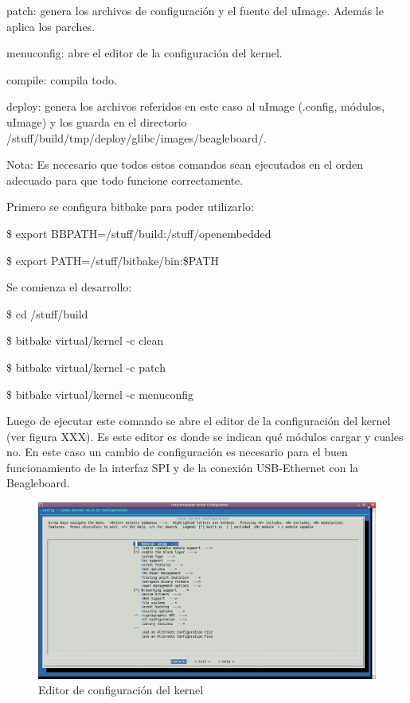 patch: genera los archivos de configuración y el fuente del uImage. Además le aplica los parches.

menuconfig: abre el editor de la configuración del kernel.

compile: compila todo.

deploy: genera los archivos referidos en este caso al uImage (.config, módulos, uImage) y los guarda en el directorio /stuff/build/tmp/deploy/glibc/images/beagleboard/.

\bigskip
Nota: Es necesario que todos estos comandos sean ejecutados en el orden adecuado para que todo funcione correctamente.

\bigskip
Primero se configura bitbake para poder utilizarlo:

\centerline{\$ export BBPATH=/stuff/build:/stuff/openembedded}

\centerline{\$ export PATH=/stuff/bitbake/bin:\$PATH}

\bigskip
Se comienza el desarrollo:

\centerline{\$ cd /stuff/build}

\centerline{\$ bitbake virtual/kernel -c clean}

\centerline{\$ bitbake virtual/kernel -c patch}

\centerline{\$ bitbake virtual/kernel -c menuconfig}

\bigskip
Luego de ejecutar este comando se abre el editor de la configuración del kernel (ver figura XXX). Es este editor es donde se indican qué módulos cargar y cuales no. En este caso un cambio de  configuración es necesario para el buen funcionamiento de la interfaz SPI y de la conexión USB-Ethernet con la Beagleboard.

\begin{figure}[H]
\centering
  \begin{center}
  \includegraphics[scale=.3]{Imagenes/kernel.png} 
  \end{center}
  \caption{Editor de configuración del kernel}\label{Fig:HW} 
\end{figure}

